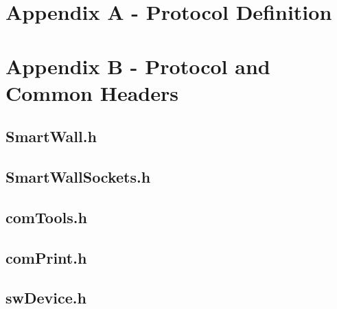 \documentclass[12pt]{article}
\begin{document}
\section{Appendix A - Protocol Definition}
\label{sec:AppendixA}



\pagebreak

\section{Appendix B - Protocol and Common Headers}
\label{sec:AppendixB}

\pagebreak

\subsection{SmartWall.h}
\label{sec:AppendixB.SmartWall.h}


\pagebreak

\subsection{SmartWallSockets.h}
\label{sec:AppendixB.SmartWallSockets.h}


\pagebreak

\subsection{comTools.h}
\label{sec:AppendixB.comTools.h}


\pagebreak

\subsection{comPrint.h}
\label{sec:AppendixB.comPrint.h}


\pagebreak

\subsection{swDevice.h}
\label{sec:AppendixB.swDevice.h}

\end{document}
